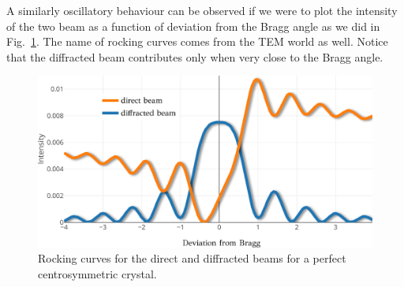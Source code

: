 A similarly oscillatory behaviour can be observed if we were to plot the intensity of the two beam as a function of deviation from the Bragg angle as we did in Fig.~\ref{Fig:rocking}. The name of rocking curves comes from the TEM world as well. Notice that the diffracted beam contributes only when very close to the Bragg angle. 


\begin{figure}[ht]
    \centering
\includegraphics[width=0.82\linewidth]{Figures/rocking.png}
\caption[Rocking curves.]{Rocking curves for the direct and diffracted beams for a perfect centrosymmetric crystal. }
\label{Fig:rocking}

\end{figure}
